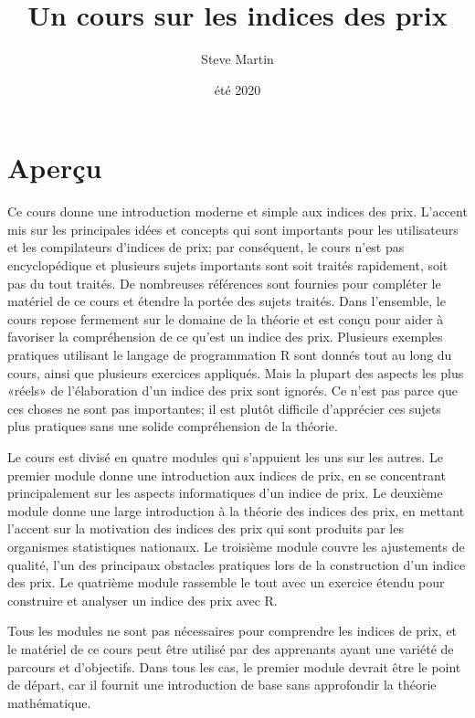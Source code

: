 \documentclass[
]{article}
\title{Un cours sur les indices des prix}
\author{Steve Martin}
\date{été 2020}
\begin{document}
\maketitle

{
\setcounter{tocdepth}{2}
\tableofcontents
}
\hypertarget{aperuxe7u}{%
\section*{Aperçu}\label{aperuxe7u}}

Ce cours donne une introduction moderne et simple aux indices des prix. L'accent mis sur les principales idées et concepts qui sont importants pour les utilisateurs et les compilateurs d'indices de prix; par conséquent, le cours n'est pas encyclopédique et plusieurs sujets importants sont soit traités rapidement, soit pas du tout traités. De nombreuses références sont fournies pour compléter le matériel de ce cours et étendre la portée des sujets traités. Dans l'ensemble, le cours repose fermement sur le domaine de la théorie et est conçu pour aider à favoriser la compréhension de ce qu'est un indice des prix. Plusieurs exemples pratiques utilisant le langage de programmation R sont donnés tout au long du cours, ainsi que plusieurs exercices appliqués. Mais la plupart des aspects les plus «réels» de l'élaboration d'un indice des prix sont ignorés. Ce n'est pas parce que ces choses ne sont pas importantes; il est plutôt difficile d'apprécier ces sujets plus pratiques sans une solide compréhension de la théorie.

Le cours est divisé en quatre modules qui s'appuient les uns sur les autres. Le premier module donne une introduction aux indices de prix, en se concentrant principalement sur les aspects informatiques d'un indice de prix. Le deuxième module donne une large introduction à la théorie des indices des prix, en mettant l'accent sur la motivation des indices des prix qui sont produits par les organismes statistiques nationaux. Le troisième module couvre les ajustements de qualité, l'un des principaux obstacles pratiques lors de la construction d'un indice des prix. Le quatrième module rassemble le tout avec un exercice étendu pour construire et analyser un indice des prix avec R.

Tous les modules ne sont pas nécessaires pour comprendre les indices de prix, et le matériel de ce cours peut être utilisé par des apprenants ayant une variété de parcours et d'objectifs. Dans tous les cas, le premier module devrait être le point de départ, car il fournit une introduction de base sans approfondir la théorie mathématique.
\end{document}
